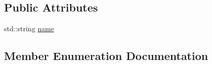 \subsection*{Public Attributes}
\begin{DoxyCompactItemize}
\item 
std\+::string \hyperlink{structsymcpp_1_1ComplexToken_a0a731b7c110006afd8a1a44b400d19b4}{name}
\end{DoxyCompactItemize}


\subsection{Member Enumeration Documentation}
